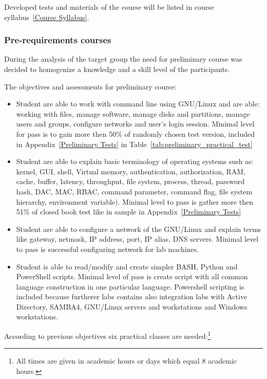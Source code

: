Developed tests and materials of the course will be listed in course syllabus~\ref{Course Syllabus}.

\subsubsection{Pre-requirements courses}

During the analysis of the target group the need for preliminary course was decided to homogenize a knowledge and a skill level of the participants.

The objectives and assessments for preliminary course:
\begin{itemize}
\item Student are able to work with command line using GNU/Linux and are able: working with files, manage software, manage disks and partitions, manage users and groups, configure networks and user's login session. Minimal level for pass is to gain more then 50\% of randomly chosen test version, included in Appendix~\ref{Preliminary Tests} in Table~\ref{tab:preliminary_practical_test}
\item Student are able to explain basic terminology of operating systems sush as: kernel, GUI, shell, Virtual memory, authentication, authorization, RAM, cache, buffer, latency, throughput, file system, process, thread, password hash, DAC, MAC, RBAC, command parameter, command flag, file system hierarchy, environment variable). Minimal level to pass is gather more then 51\% of closed book test like in sample in Appendix~\ref{Preliminary Tests}
\item Student are able to configure a network of the GNU/Linux and explain terms like gateway, netmask, IP address, port, IP alias, DNS servers. Minimal level to pass is successful configuring network for lab machines.
\item Student is able to read/modify and create simpler BASH, Python and PowerShell scripts. Minimal level of pass is create script with all common language construction in one particular language. Powershell scripting is included because furtherer labs contains also integration labs with Active Directory, SAMBA4, GNU/Linux servers and workstations and Windows workstations.
\end{itemize}

According to previous objectives six practical classes are needed:\footnote{All times are given in academic hours or days which equal 8 academic hours.}

